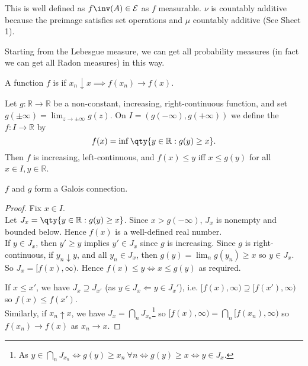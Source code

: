 \begin{remark}
	This is well defined as $f\inv(A) \in \mathcal{E}$ as $f$ measurable. $\nu$ is countably additive because the preimage satisfies set operations and $\mu$ countably additive (See Sheet 1).
\end{remark}

Starting from the Lebesgue measure, we can get all probability measures (in fact we can get all Radon measures) in this way.

\begin{definition}
	A function $f$ is  if $x_n \downarrow x \implies f(x_n) \to f(x)$.
\end{definition}

\begin{lemma}
	Let $g \colon \mathbb R \to \mathbb R$ be a non-constant, increasing, right-continuous function, and set $g(\pm\infty) = \lim_{z \to \pm \infty} g(z)$.
	On $I = (g(-\infty), g(+\infty))$ we define the  $f : I \to \mathbb{R}$ by
	\[ f(x) = \inf \qty{y \in \mathbb R : g(y) \geq x}. \]
	Then $f$ is increasing, left-continuous, and $f(x) \leq y$ iff $x \leq g(y)$ for all $x \in I, y \in \mathbb R$.
\end{lemma}

\begin{remark}
	$f$ and $g$ form a Galois connection.
\end{remark}

\begin{proof}
	Fix $x \in I$. \\
	Let $J_x = \qty{y \in \mathbb R : g(y) \geq x}$.
	Since $x > g(-\infty)$, $J_x$ is nonempty and bounded below.
	Hence $f(x)$ is a well-defined real number. \\
	If $y \in J_x$, then $y' \geq y$ implies $y' \in J_x$ since $g$ is increasing.
	Since $g$ is right-continuous, if $y_n \downarrow y$, and all $y_n \in J_x$, then $g(y) = \lim_n g(y_n) \geq x$ so $y \in J_x$. \\
	So $J_x = [f(x), \infty)$.
	Hence $f(x) \leq y \iff x \leq g(y)$ as required.

	If $x \leq x'$, we have $J_x \supseteq J_{x'}$ (as $y \in J_x \Longleftarrow y \in J_x'$), i.e. $[f(x), \infty) \supseteq [f(x'), \infty)$ so $f(x) \leq f(x')$. \\
	Similarly, if $x_n \uparrow x$, we have $J_x = \bigcap_n J_{x_n}$\footnote{As $y \in \bigcap_n J_{x_n} \iff g(y) \geq x_n \ \forall n \iff g(y) \geq x \iff y \in J_x$.} so $[f(x), \infty) = \bigcap_n [f(x_n), \infty)$ so $f(x_n) \to f(x)$ as $x_n \to x$.
\end{proof}

